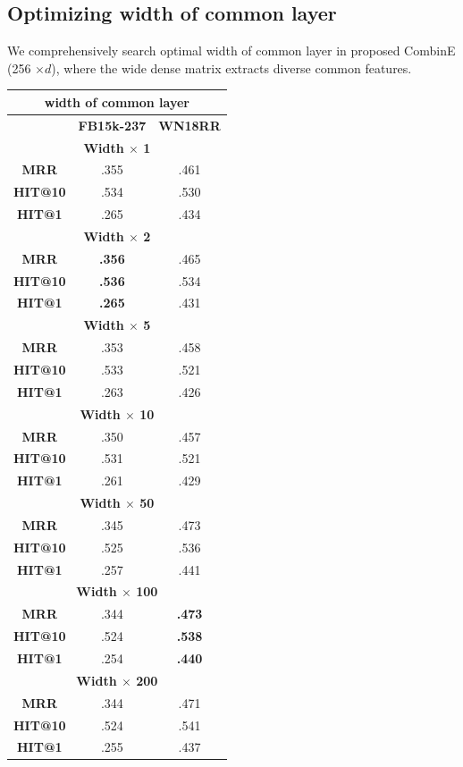 \subsection{Optimizing width of common layer}
We comprehensively search optimal width of common layer in proposed CombinE (256 $\times d$), where the wide dense matrix extracts diverse common features.
\begin{table}[h]
\centering
\begin{tabular}{c|c|c}
\hline
\multicolumn{3}{c}{\textbf{width of common layer}}\\
\hline
 & \textbf{FB15k-237} & \textbf{WN18RR}\\
 \hline
 \multicolumn{3}{c}{\textbf{Width $\times$ 1}}\\
 \textbf{MRR} & .355 & .461 \\
 \textbf{HIT@10} & .534 & .530 \\
 \textbf{HIT@1} & .265 & .434 \\
 \hline
  \multicolumn{3}{c}{\textbf{Width $\times$ 2}}\\
 \textbf{MRR} & \textbf{.356} & .465 \\
 \textbf{HIT@10} & \textbf{.536} & .534 \\
 \textbf{HIT@1} & \textbf{.265} & .431 \\
 \hline
  \multicolumn{3}{c}{\textbf{Width $\times$ 5}}\\
 \textbf{MRR} & .353 & .458 \\
 \textbf{HIT@10} & .533 & .521 \\
 \textbf{HIT@1} & .263 & .426 \\
\hline
  \multicolumn{3}{c}{\textbf{Width $\times$ 10}}\\
 \textbf{MRR} & .350 & .457 \\
 \textbf{HIT@10} & .531 & .521 \\
 \textbf{HIT@1} & .261 & .429 \\
\hline
  \multicolumn{3}{c}{\textbf{Width $\times$ 50}}\\
 \textbf{MRR} & .345 & .473 \\
 \textbf{HIT@10} & .525 & .536 \\
 \textbf{HIT@1} & .257 & .441 \\
\hline
 \multicolumn{3}{c}{\textbf{Width $\times$ 100}}\\
 \textbf{MRR} & .344 & \textbf{.473} \\
 \textbf{HIT@10} & .524 & \textbf{.538} \\
 \textbf{HIT@1} & .254 & \textbf{.440} \\
 \hline
 \multicolumn{3}{c}{\textbf{Width $\times$ 200}}\\
 \textbf{MRR} & .344 & .471 \\
 \textbf{HIT@10} & .524 & .541 \\
 \textbf{HIT@1} & .255 & .437 \\
\hline
\hline
\end{tabular}


\end{table}
